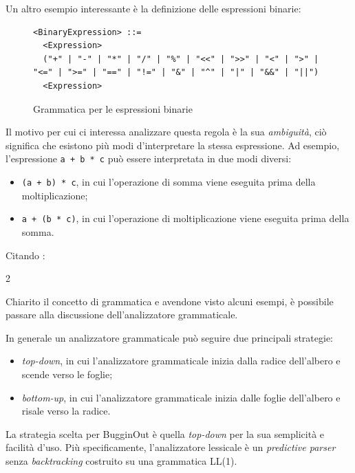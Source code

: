 Un altro esempio interessante \`e la definizione delle espressioni binarie:
\begin{figure}[H]
	\centering
	\begin{verbatim}
<BinaryExpression> ::=
  <Expression>
  ("+" | "-" | "*" | "/" | "%" | "<<" | ">>" | "<" | ">" | "<=" | ">=" | "==" | "!=" | "&" | "^" | "|" | "&&" | "||")
  <Expression>
	\end{verbatim}
	\label{fig:bugginout-binary-expression}
	\caption{Grammatica per le espressioni binarie}
\end{figure}

Il motivo per cui ci interessa analizzare questa regola \`e la sua \emph{ambiguit\`a}, ci\`o significa che esistono pi\`u modi d'interpretare la stessa espressione. Ad esempio, l'espressione \texttt{a + b * c} pu\`o essere interpretata in due modi diversi:
\begin{itemize}
	\item \texttt{(a + b) * c}, in cui l'operazione di somma viene eseguita prima della moltiplicazione;
	\item \texttt{a + (b * c)}, in cui l'operazione di moltiplicazione viene eseguita prima della somma.
\end{itemize}
Citando \cite{alfred2007compilers}:
\begin{parcolumns}[colwidths={1=0.44\textwidth,2=0.44\textwidth},rulebetween=true,nofirstindent=true,sloppy=true]{2}
	\colplacechunks
\end{parcolumns}

Chiarito il concetto di grammatica e avendone visto alcuni esempi, \`e possibile passare alla discussione dell'analizzatore grammaticale.

In generale un analizzatore grammaticale pu\`o seguire due principali strategie:
\begin{itemize}
	\item \emph{top-down}, in cui l'analizzatore grammaticale inizia dalla radice dell'albero e scende verso le foglie;
	\item \emph{bottom-up}, in cui l'analizzatore grammaticale inizia dalle foglie dell'albero e risale verso la radice.
\end{itemize}
La strategia scelta per BugginOut \`e quella \emph{top-down} per la sua semplicit\`a e facilit\`a d'uso. Pi\`u specificamente, l'analizzatore lessicale \`e un \textit{predictive parser} senza \textit{backtracking} costruito su una grammatica LL(1).

